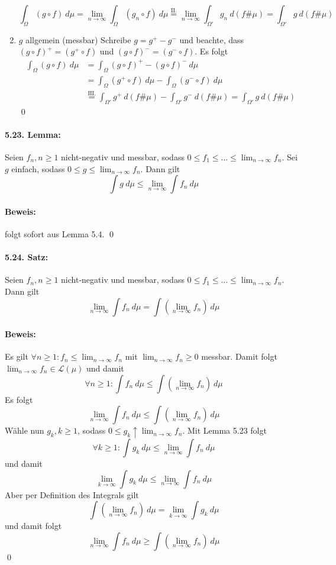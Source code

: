 \documentclass[12pt]{report}
\begin{document}
\begin{enumerate}[label=\Roman*.]
     $$\int_\Omega (g\circ f)\ d\mu=\lim_{n\to\infty}\int_\Omega(g_n\circ f)\ d\mu\overset{\text{II.}}{=}\lim_{n\to\infty}\int_{\Omega'}g_n\ d(f\#\mu)=\int_{\Omega'}g\ d(f\#\mu)$$
     \item $g$ allgemein (messbar)\newline
     Schreibe $g=g^+-g^-$ und beachte, dass $(g\circ f)^+=(g^+\circ f)$ und $(g\circ f)^-=(g^-\circ f)$. Es folgt
     \begin{align*}
         \int_\Omega(g\circ f)\ d\mu&=\int_\Omega(g\circ f)^+-(g\circ f)^-\ d\mu\\
         &=\int_\Omega(g^+\circ f)\ d \mu-\int_\Omega(g^-\circ f)\ d\mu\\
         &\overset{\text{III.}}{=}\int_{\Omega'} g^+\ d(f\#\mu)-\int_{\Omega'}g^-\ d(f\#\mu)
         =\int_{\Omega'}g\ d(f\#\mu)
     \end{align*}
     \qed
 \end{enumerate}
 
 \paragraph{5.23. Lemma:}Seien $f_n,n\geq1$ nicht-negativ und messbar, sodass $0\leq f_1\leq\hdots\leq\displaystyle\lim_{n\to\infty}f_n$. Sei $g$ einfach, sodass $0\leq g\leq\displaystyle\lim_{n\to\infty}f_n$. Dann gilt
 $$\int g\ d\mu\leq\lim_{n\to\infty}\int f_n\ d\mu$$
 
 \paragraph{Beweis:} folgt sofort aus Lemma 5.4. \qed
 
 \paragraph{5.24. Satz:}Seien $f_n,n\geq1$ nicht-negativ und messbar, sodass $0\leq f_1\leq\hdots\leq\displaystyle\lim_{n\to\infty}f_n$. Dann gilt 
 $$\lim_{n\to\infty}\int f_n\ d\mu=\int \left(\lim_{n\to\infty} f_n\right)\ d\mu$$
 
 \paragraph{Beweis:}Es gilt $\forall n\geq1:f_n\leq\displaystyle\lim_{n\to\infty}f_n$ mit $\displaystyle\lim_{n\to\infty}f_n\geq0$ messbar. Damit folgt $\displaystyle\lim_{n\to\infty}f_n\in\mathcal{L}(\mu)$ und damit
 $$\forall n\geq 1:\int f_n\ d\mu\leq\int\left(\lim_{n\to\infty}f_n\right)\ d\mu$$
 Es folgt 
 $$\lim_{n\to\infty}\int f_n\ d\mu\leq\int\left(\lim_{n\to\infty} f_n\right)\ d\mu$$
 W\"ahle nun $g_k,k\geq1$, sodass $\displaystyle0\leq g_k\uparrow \lim_{n\to\infty}f_n$. Mit Lemma 5.23 folgt 
 $$\forall k\geq1:\int g_k\ d\mu\leq\lim_{n\to\infty}\int f_n\ d\mu$$
 und damit 
 $$\lim_{k\to\infty}\int g_k\ d\mu\leq\lim_{n\to\infty}\int f_n\ d\mu$$
 Aber per Definition des Integrals gilt
 $$\int\left(\lim_{n\to\infty}f_n\right)\ d\mu=\lim_{k\to\infty}\int g_k\ d\mu$$
 und damit folgt 
 $$\lim_{n\to\infty}\int f_n\ d\mu\geq\int\left(\lim_{n\to\infty} f_n\right)\ d\mu$$
 \qed
 
\end{document}
